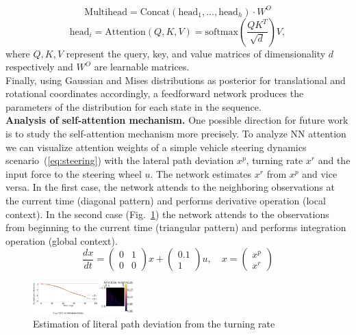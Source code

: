 \documentclass[acmtog]{techreportacmart}
\begin{document}
\begin{equation}
  \label{eq:multihead}
  \text{Multihead} = \text{Concat}(\text{head}_1, \ldots, \text{head}_h) \cdot W^{O}
\end{equation}
\begin{equation}
  \label{eq:attention}
  \text{head}_i = \text{Attention}(Q, K, V) = \text{softmax}\left(\frac{{QK^T}}{\sqrt{d}}\right)V,
\end{equation}
where ${Q, K, V}$ represent the query, key, and value matrices of dimensionality ${d}$ respectively and $W^{O}$ are learnable matrices.\\
Finally, using Gaussian and Mises distributions as posterior for translational and rotational coordinates accordingly, a feedforward network produces the parameters of the distribution for each state in the sequence.
\\
\textbf{Analysis of self-attention mechanism.}
One possible direction for future work is to study the self-attention mechanism more precisely. To analyze NN attention we can visualize attention weights of a simple vehicle steering dynamics scenario~(\ref{eq:steering}) with the lateral path deviation ${x^{p}}$, turning rate ${x^{r}}$ and the input force to the steering wheel ${u}$. The network estimates ${x^{r}}$ from ${x^{p}}$ and vice versa. In the first case, the network attends to the neighboring observations at the current time (diagonal pattern) and performs derivative operation (local context). In the second case (Fig.~\ref{fig:integration}) the network attends to the observations from beginning to the current time (triangular pattern) and performs integration operation (global context).
\begin{equation}
  \label{eq:steering}
  \frac{dx}{dt} = 
  \begin{pmatrix}
  0 & 1 \\ 0 & 0 
  \end{pmatrix}
  x + 
  \begin{pmatrix}
  0.1 \\ 1 
  \end{pmatrix}
  u, \quad x = \begin{pmatrix} x^{p} \\ x^{r} \end{pmatrix}
\end{equation}
\begin{figure}
  \centering
  \includegraphics[width=0.35\textwidth]{integration}
  \caption{Estimation of literal path deviation from the turning rate}
  \label{fig:integration}
\end{figure}
\end{document}
